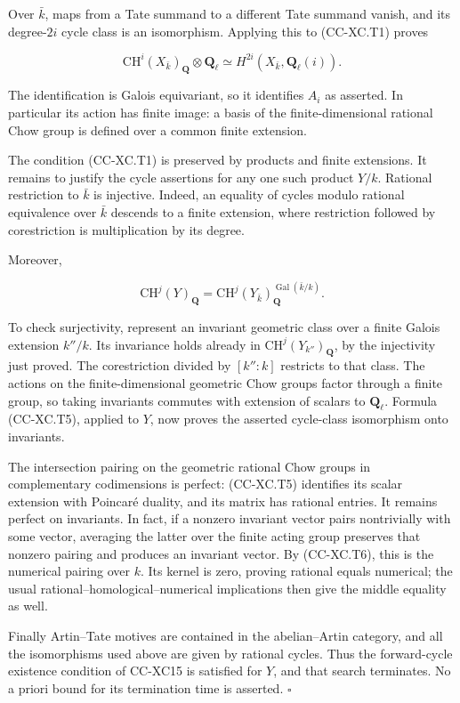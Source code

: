 Over \(\bar k\), maps from a Tate summand to a different Tate summand
vanish, and its degree-\(2i\) cycle class is an isomorphism. Applying
this to (CC-XC.T1) proves

\[
 \mathrm{CH}^i(X_{\bar k})_{\mathbf Q}\otimes\mathbf Q_\ell
       \simeq H^{2i}(X_{\bar k},\mathbf Q_\ell(i)).
\tag{CC-XC.T5}
\]

The identification is Galois equivariant, so it identifies \(A_i\) as
asserted. In particular its action has finite image: a basis of the
finite-dimensional rational Chow group is defined over a common finite
extension.

The condition (CC-XC.T1) is preserved by products and finite extensions.
It remains to justify the cycle assertions for any one such product
\(Y/k\). Rational restriction to \(\bar k\) is injective. Indeed, an
equality of cycles modulo rational equivalence over \(\bar k\) descends
to a finite extension, where restriction followed by corestriction is
multiplication by its degree.

Moreover,

\[
 \mathrm{CH}^j(Y)_{\mathbf Q}
    =\mathrm{CH}^j(Y_{\bar k})_{\mathbf Q}^{\operatorname{Gal}(\bar k/k)}.
\tag{CC-XC.T6}
\]

To check surjectivity, represent an invariant geometric class over a
finite Galois extension \(k''/k\). Its invariance holds already in
\(\mathrm{CH}^j(Y_{k''})_{\mathbf Q}\), by the injectivity just proved.
The corestriction divided by \([k'':k]\) restricts to that class. The
actions on the finite-dimensional geometric Chow groups factor through a
finite group, so taking invariants commutes with extension of scalars to
\(\mathbf Q_\ell\). Formula (CC-XC.T5), applied to \(Y\), now proves the
asserted cycle-class isomorphism onto invariants.

The intersection pairing on the geometric rational Chow groups in
complementary codimensions is perfect: (CC-XC.T5) identifies its scalar
extension with Poincaré duality, and its matrix has rational entries. It
remains perfect on invariants. In fact, if a nonzero invariant vector
pairs nontrivially with some vector, averaging the latter over the
finite acting group preserves that nonzero pairing and produces an
invariant vector. By (CC-XC.T6), this is the numerical pairing over
\(k\). Its kernel is zero, proving rational equals numerical; the usual
rational--homological--numerical implications then give the middle
equality as well.

Finally Artin--Tate motives are contained in the abelian--Artin
category, and all the isomorphisms used above are given by rational
cycles. Thus the forward-cycle existence condition of CC-XC15 is
satisfied for \(Y\), and that search terminates. No a priori bound for
its termination time is asserted. \(\square\)

